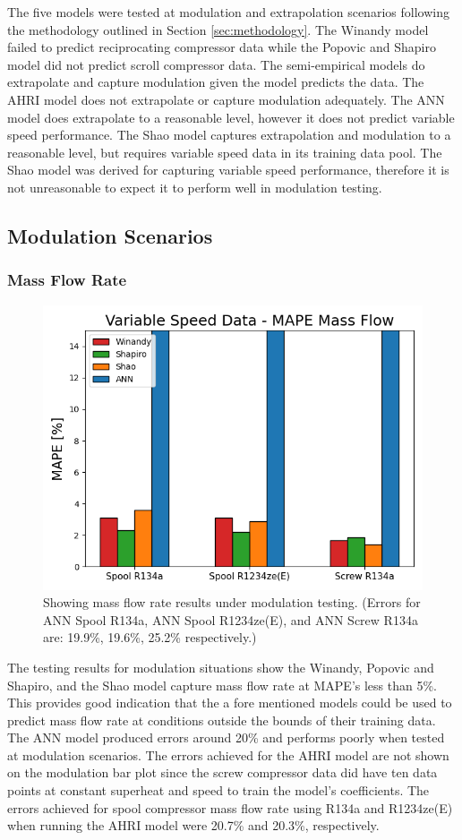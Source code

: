 \documentclass[preprint,11pt,authoryear]{elsarticle}
\begin{document}
The five models were tested at modulation and extrapolation scenarios following the methodology outlined in Section \ref{sec:methodology}. The Winandy model failed to predict reciprocating compressor data while the Popovic and Shapiro model did not predict scroll compressor data. The semi-empirical models do extrapolate and capture modulation given the model predicts the data. The AHRI model does not extrapolate or capture modulation adequately. The ANN model does extrapolate to a reasonable level, however it does not predict variable speed performance. The Shao model captures extrapolation and modulation to a reasonable level, but requires variable speed data in its training data pool. The Shao model was derived for capturing variable speed performance, therefore it is not unreasonable to expect it to perform well in modulation testing.

\subsection{Modulation Scenarios}
\subsubsection{Mass Flow Rate}

\begin{figure}[h]
\captionsetup{justification=centering}
\centering
\includegraphics[width=0.7\linewidth]{mdot_vspeed.png}
\caption{Showing mass flow rate results under modulation testing. (Errors for ANN Spool R134a, ANN Spool R1234ze(E), and ANN Screw R134a are: 19.9\%, 19.6\%, 25.2\% respectively.)}
\label{fig:mdot_vspd}
\end{figure}
\FloatBarrier

The testing results for modulation situations show the Winandy, Popovic and Shapiro, and the Shao model capture mass flow rate at MAPE's less than 5\%. This provides good indication that the a fore mentioned models could be used to predict mass flow rate at conditions outside the bounds of their training data. The ANN model produced errors around 20\% and performs poorly when tested at modulation scenarios. The errors achieved for the AHRI model are not shown on the modulation bar plot since the screw compressor data did have ten data points at constant superheat and speed to train the model's coefficients. The errors achieved for spool compressor mass flow rate using R134a and R1234ze(E) when running the AHRI model were 20.7\% and 20.3\%, respectively. 
\end{document}
